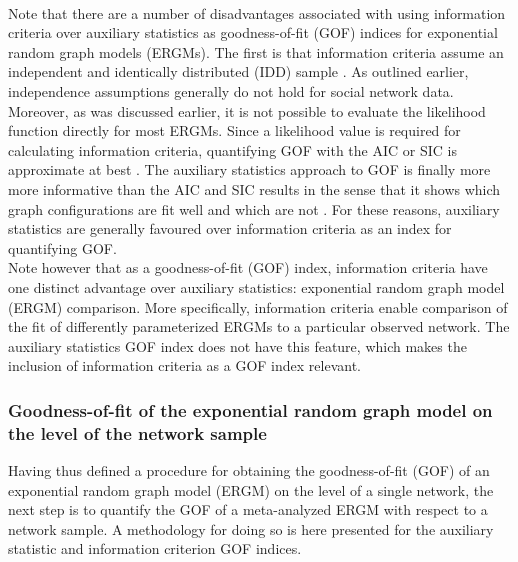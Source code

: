 \documentclass[a4paper, man, floatsintext]{apa6}
\begin{document}
\\
Note that there are a number of disadvantages associated with using information criteria over auxiliary statistics as goodness-of-fit (GOF) indices for exponential random graph models (ERGMs). The first is that information criteria assume an independent and identically distributed (IDD) sample \cite{wit2012all}. As outlined earlier, independence assumptions generally do not hold for social network data. Moreover, as was discussed earlier, it is not possible to evaluate the likelihood function directly for most ERGMs. Since a likelihood value is required for calculating information criteria, quantifying GOF with the AIC or SIC is approximate at best \cite{wit2012all}. The auxiliary statistics approach to GOF is finally more more informative than the AIC and SIC results in the sense that it shows which graph configurations are fit well and which are not \cite{wit2012all}. For these reasons, auxiliary statistics are generally favoured over information criteria as an index for quantifying GOF. 
\\
Note however that as a goodness-of-fit (GOF) index, information criteria have one distinct advantage over auxiliary statistics: exponential random graph model (ERGM) comparison. More specifically, information criteria enable comparison of the fit of differently parameterized ERGMs to a particular observed network. The auxiliary statistics GOF index does not have this feature, which makes the inclusion of information criteria as a GOF index relevant. 
\\
\subsubsection{Goodness-of-fit of the exponential random graph model on the level of the network sample}
Having thus defined a procedure for obtaining the goodness-of-fit (GOF) of an exponential random graph model (ERGM) on the level of a single network, the next step is to quantify the GOF of a meta-analyzed ERGM with respect to a network sample. A methodology for doing so is here presented for the auxiliary statistic and information criterion GOF indices. 
\\
\end{document}
